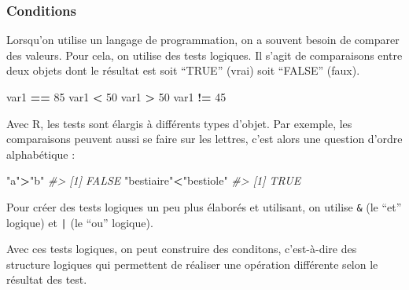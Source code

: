 \documentclass[]{article}
\newenvironment{Shaded}{\begin{snugshade}}{\end{snugshade}}
\newcommand{\CommentTok}[1]{\textcolor[rgb]{0.56,0.35,0.01}{\textit{#1}}}
\newcommand{\DecValTok}[1]{\textcolor[rgb]{0.00,0.00,0.81}{#1}}
\newcommand{\NormalTok}[1]{#1}
\newcommand{\OperatorTok}[1]{\textcolor[rgb]{0.81,0.36,0.00}{\textbf{#1}}}
\newcommand{\StringTok}[1]{\textcolor[rgb]{0.31,0.60,0.02}{#1}}
\begin{document}
\hypertarget{conditions}{%
\subsubsection{Conditions}\label{conditions}}

Lorsqu'on utilise un langage de programmation, on a souvent besoin de comparer
des valeurs. Pour cela, on utilise des tests logiques. Il s'agit de comparaisons
entre deux objets dont le résultat est soit ``TRUE'' (vrai) soit ``FALSE'' (faux).

\begin{Shaded}
\begin{Highlighting}[]
\NormalTok{var1 }\OperatorTok{==}\StringTok{ }\DecValTok{85}
\NormalTok{var1 }\OperatorTok{<}\StringTok{ }\DecValTok{50}
\NormalTok{var1 }\OperatorTok{>}\StringTok{ }\DecValTok{50}
\NormalTok{var1 }\OperatorTok{!=}\StringTok{ }\DecValTok{45}
\end{Highlighting}
\end{Shaded}

Avec R, les tests sont élargis à différents types d'objet. Par exemple, les
comparaisons peuvent aussi se faire sur les lettres, c'est alors une question
d'ordre alphabétique :

\begin{Shaded}
\begin{Highlighting}[]
\StringTok{"a"}\OperatorTok{>}\StringTok{"b"}
\CommentTok{#> [1] FALSE}
\StringTok{"bestiaire"}\OperatorTok{<}\StringTok{"bestiole"}
\CommentTok{#> [1] TRUE}
\end{Highlighting}
\end{Shaded}

Pour créer des tests logiques un peu plus élaborés et utilisant, on utilise \texttt{\&} (le ``et'' logique) et \texttt{|} (le ``ou'' logique).

\begin{Shaded}
\end{Shaded}

Avec ces tests logiques, on peut construire des conditons, c'est-à-dire des structure logiques qui permettent de réaliser une opération différente selon le résultat des test.
\end{document}

